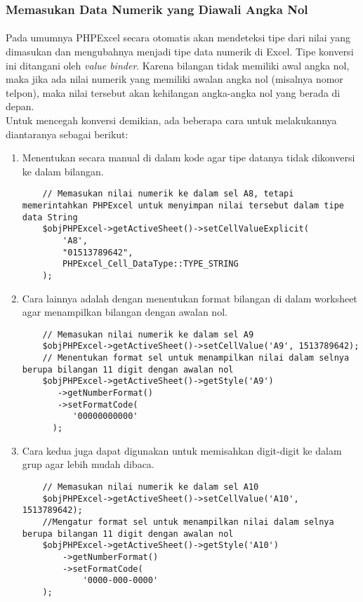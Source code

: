 \subsubsection{Memasukan Data Numerik yang Diawali Angka Nol}
\paragraph{} Pada umumnya PHPExcel secara otomatis akan mendeteksi tipe dari nilai yang dimasukan dan mengubahnya menjadi tipe data numerik di Excel. Tipe konversi ini ditangani oleh \textit{value binder}. Karena bilangan tidak memiliki awal angka nol, maka jika ada nilai numerik yang memiliki awalan angka nol (misalnya nomor telpon), maka nilai tersebut akan kehilangan angka-angka nol yang berada di depan.\cite{phpexcel:14}  \\
Untuk mencegah konversi demikian, ada beberapa cara untuk melakukannya diantaranya sebagai berikut:
\begin{enumerate}
	\item Menentukan secara manual di dalam kode agar tipe datanya tidak dikonversi ke dalam bilangan.
	\begin{lstlisting}
	// Memasukan nilai numerik ke dalam sel A8, tetapi memerintahkan PHPExcel untuk menyimpan nilai tersebut dalam tipe data String
	$objPHPExcel->getActiveSheet()->setCellValueExplicit(
	    'A8', 
	    "01513789642",
	    PHPExcel_Cell_DataType::TYPE_STRING
	);
	\end{lstlisting}
	\item Cara lainnya adalah dengan menentukan format bilangan di dalam worksheet agar menampilkan bilangan dengan awalan nol.
	\begin{lstlisting}
	// Memasukan nilai numerik ke dalam sel A9
	$objPHPExcel->getActiveSheet()->setCellValue('A9', 1513789642);
	// Menentukan format sel untuk menampilkan nilai dalam selnya berupa bilangan 11 digit dengan awalan nol
	$objPHPExcel->getActiveSheet()->getStyle('A9')
 	   ->getNumberFormat()
 	   ->setFormatCode(
  	      '00000000000'
  	  );
	\end{lstlisting}
	\item Cara kedua juga dapat digunakan untuk memisahkan digit-digit ke dalam grup agar lebih mudah dibaca.
	\begin{lstlisting}
	// Memasukan nilai numerik ke dalam sel A10
	$objPHPExcel->getActiveSheet()->setCellValue('A10', 1513789642);
	//Mengatur format sel untuk menampilkan nilai dalam selnya berupa bilangan 11 digit dengan awalan nol
	$objPHPExcel->getActiveSheet()->getStyle('A10')
    	->getNumberFormat()
    	->setFormatCode(
        	'0000-000-0000'
    );
	\end{lstlisting}
\end{enumerate}
